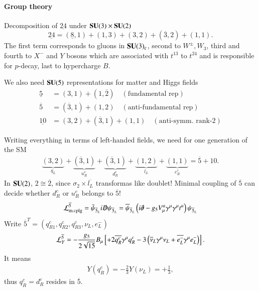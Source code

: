 \paragraph{Group theory} Decomposition of $\underline{24}$ under $\mathbf{SU}(3) \times \mathbf{SU}(2)$
\begin{equation}
   \underline{24} = (\underline{8}, 1) + (1, 3) + (3,2) + (\overline{3}, 2) + (1,1). \label{2.13}
\end{equation}
The first term corresponds to gluons in $\mathbf{SU}(3)_\text{c}$, second to $W^\pm, W_3$, third and fourth to $X^-$ and $Y$ bosons which are associated with $t^{13}$ to $t^{24}$ and is responsible for $p$-decay, last to hypercharge $B$.

We also need $\mathbf{SU}(5)$ representations for matter and Higgs fields
\begin{align}
   \underline{5} &= (3,1) + (1,\overline{2}) \quad (\text{fundamental rep})  \label{2.14} \\
   \overline{5} &= (\overline{3},1) + (1,2) \quad (\text{anti-fundamental rep}) \quad \label{2.14} \\
   \underline{10} &= (3,2) + (\overline{3}, 1) + (1,1) \quad (\text{anti-symm. rank-}2) \label{2.15}
\end{align}

Writing everything in terms of left-handed fields, we need for one generation of the SM
\begin{align}
   \underbrace{(3,2)}_{q_L} + \underbrace{(\overline{3}, 1)}_{u_R^c} + \underbrace{(\overline{3}, 1)}_{d_R^c} + \underbrace{(1,2)}_{l_L} + \underbrace{(1,1)}_{e_R^c} = \overline{5} + 10. \label{2.16}
\end{align}
In $\mathbf{SU}(2)$, $2 \cong \overline{2}$, since $\sigma_2 \times \overline{l_L}$ transformas like doublet! Minimal coupling of $\overline{5}$ can decide whether $d_R^c$ or $u_R^c$ belongs to $\overline{5}$!
\begin{equation}
   \mathcal{L}_\text{m.cplg}^{\overline{5}} = \bar{\psi} _{\overline{5}_L} i \slashed{D} \psi_{\overline{5}_L} = \overline{\psi}_{\overline{5}_L} \left( i \slashed{\partial} - g_5 V_\mu^a \gamma^\mu \gamma^\mu t^a \right) \psi_{\overline{5}_L} \label{2.17}
\end{equation}
Write $\overline{5}^T = (q_{R1}^c, q_{R2}^c, q^c_{R 3}, \nu_L, e^-_L)$
\begin{equation}
   \mathcal{L}_Y^{\overline{5}} = - \frac{g_5}{2\sqrt{15}} B_\mu \left[ + 2 \overline{q^c_R} \gamma^\mu q_R^c - 3 \left( \overline{\nu}_L \gamma^\mu \nu_L + \overline{e^-_L} \gamma^\mu e^-_L \right) \right]. \label{2.18}
\end{equation}
It means
\begin{align}
   Y(q_R^c) = - \frac{2}{3} Y(\nu_L) = + \frac{1}{3}, \label{2.19}
\end{align}
thus $q_R^c = d_R^c$ resides in $\overline{5}$.

